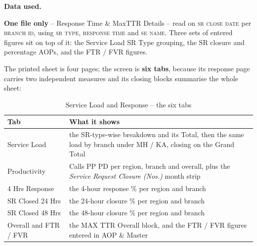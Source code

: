 \documentclass[11pt,a4paper]{article}
\newcommand{\dataused}{\textbf{Data used.}\par}
\newcommand{\col}[1]{\textsc{\small #1}}
\begin{document}
\dataused
\textbf{One file only} -- Response Time \& MaxTTR Details -- read on \col{sr close date}
per \col{branch id}, using \col{sr type}, \col{response time} and \col{se name}. Three
sets of entered figures sit on top of it: the Service Load SR Type grouping, the SR
closure and percentage AOPs, and the FTR / FVR figures.

The printed sheet is four pages; the screen is \textbf{six tabs}, because its response
page carries two independent measures and its closing blocks summarise the whole sheet:

\begin{table}[H]\centering\small
\begin{tabularx}{\linewidth}{@{}p{3.9cm}X@{}}
\toprule
\textbf{Tab} & \textbf{What it shows} \\
\midrule
Service Load & the SR-type-wise breakdown and its Total, then the same load by branch
under MH / KA, closing on the Grand Total \\
Productivity & Calls PP PD per region, branch and overall, plus the
\emph{Service Request Closure (Nos.)} month strip \\
4 Hrs Response & the 4-hour response \% per region and branch \\
SR Closed 24 Hrs & the 24-hour closure \% per region and branch \\
SR Closed 48 Hrs & the 48-hour closure \% per region and branch \\
Overall and FTR / FVR & the MAX TTR Overall block, and the FTR / FVR figures entered in
AOP \& Master \\
\bottomrule
\end{tabularx}
\caption{Service Load and Response -- the six tabs}
\end{table}
\end{document}
